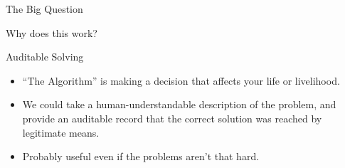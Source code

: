 \documentclass[aspectratio=169,compress,10pt]{beamer}
\begin{document}
\begin{frame}{The Big Question}

    \begin{center}
    {\huge Why does this work?}
    \end{center}

    \bigskip

\end{frame}

\begin{frame}{Auditable Solving}
    \begin{itemize}
        \item ``The Algorithm'' is making a decision that affects your life or livelihood.
        \item We could take a human-understandable description of the problem,
            and provide an auditable record that the correct solution was reached by
            legitimate means.
        \item Probably useful even if the problems aren't that hard.
    \end{itemize}
\end{frame}
\end{document}
